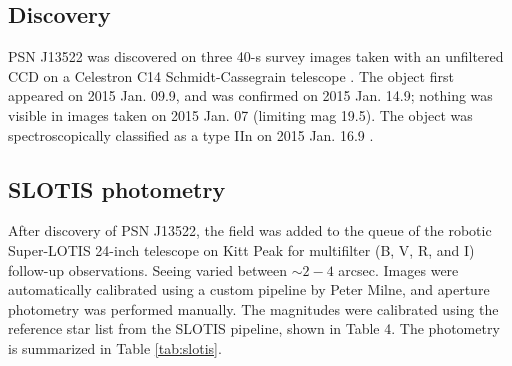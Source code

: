 \documentclass[iop]{emulateapj}
\begin{document}
\subsection{Discovery} \label{obs:disc}
PSN J13522 was discovered on three 40-s survey images taken with an unfiltered CCD on a Celestron C14 Schmidt-Cassegrain telescope \citep{Jin15}. The object first appeared on 2015 Jan. 09.9, and was confirmed on 2015 Jan. 14.9; nothing was visible in images taken on 2015 Jan. 07 (limiting mag 19.5). The object was spectroscopically classified as a type IIn on 2015 Jan. 16.9 \citep{Zha15}.

\subsection{SLOTIS photometry} \label{obs:slotis}
After discovery of PSN J13522, the field was added to the queue of the robotic Super-LOTIS 24-inch telescope \citep[SLOTIS;][]{Wil08} on Kitt Peak for multifilter (B, V, R, and I) follow-up observations. Seeing varied between $\sim2-4$ arcsec. Images were automatically calibrated using a custom pipeline by Peter Milne, and aperture photometry was performed manually. The magnitudes were calibrated using the reference star list from the SLOTIS pipeline, shown in Table 4. The photometry is summarized in Table \ref{tab:slotis}.
\end{document}
